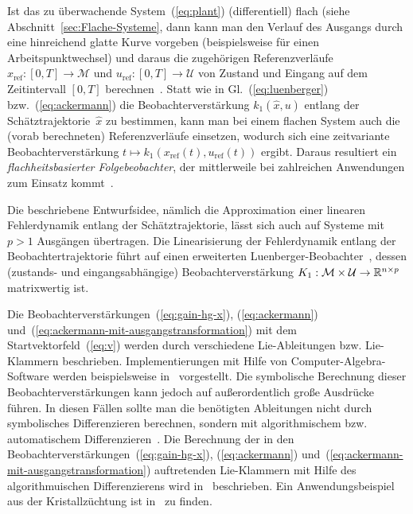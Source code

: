 \begin{remark}
Ist das zu überwachende System~(\ref{eq:plant}) (differentiell)
flach (siehe Abschnitt~\ref{sec:Flache-Systeme}, dann kann man den
Verlauf des Ausgangs durch eine hinreichend glatte Kurve vorgeben
(beispielsweise für einen Arbeitspunktwechsel) und daraus die zugehörigen
Referenzverläufe $x_{\text{ref}}:[0,T]\to\mathcal{M}$ und $u_{\text{ref}}:[0,T]\to\mathcal{U}$
von Zustand und Eingang auf dem Zeitintervall $[0,T]$ berechnen~\cite{FLMR95ijc,rothfuss97flach,rudolph2003habil}.
Statt wie in Gl.~(\ref{eq:luenberger}) bzw.~(\ref{eq:ackermann})
die Beobachterverstärkung $k_{1}(\hat{x},u)$ entlang der Schätztrajektorie~$\hat{x}$
zu bestimmen, kann man bei einem flachen System auch die (vorab berechneten)
Referenzverläufe einsetzen, wodurch sich eine zeitvariante Beobachterverstärkung
$t\mapsto k_{1}(x_{\text{ref}}(t),u_{\text{ref}}(t))$ ergibt. Daraus
resultiert ein \emph{flachheitsbasierter Folgebeobachter},
der mittlerweile bei zahlreichen Anwendungen zum Einsatz kommt~\cite{fliess96,bindel2000}.
\end{remark}

\begin{remark}
Die beschriebene Entwurfsidee, nämlich die Approximation einer linearen
Fehlerdynamik entlang der Schätztrajektorie, lässt sich auch auf Systeme
mit $p>1$ Ausgängen übertragen. Die Linearisierung der Fehlerdynamik
entlang der Beobachtertrajektorie führt auf einen erweiterten Luenberger-Beobachter~\cite{birk88,birk92},
dessen (zustands- und eingangsabhängige) Beobachterverstärkung $K_{1}:\mathcal{M}\times\mathcal{U}\to{\mathbb{R}}^{n\times p}$
matrixwertig ist.
\end{remark}

\begin{remark}
Die Beobachterverstärkungen~(\ref{eq:gain-hg-x}), (\ref{eq:ackermann})
und~(\ref{eq:ackermann-mit-ausgangstransformation}) mit dem Startvektorfeld~(\ref{eq:v})
werden durch verschiedene Lie-Ableitungen bzw. Lie-Klammern beschrieben.
Implementierungen mit Hilfe von Computer-Algebra-Software werden beispielsweise
in~\cite{birk89,birk90,birk92,rothfuss95} vorgestellt. Die symbolische
Berechnung dieser Beobachterverstärkungen kann jedoch auf außerordentlich
große Ausdrücke führen. In diesen Fällen sollte man die benötigten
Ableitungen nicht durch symbolisches Differenzieren berechnen, sondern
mit algorithmischem bzw. automatischem Differenzieren~\cite{griewank2008}.
Die Berechnung der in den Beobachterverstärkungen~(\ref{eq:gain-hg-x}),
(\ref{eq:ackermann}) und~(\ref{eq:ackermann-mit-ausgangstransformation})
auftretenden Lie-Klammern mit Hilfe des algorithmuischen Differenzierens
wird in~\cite{roebenack2003buch,roebenack2004ima,roebenack2004nolcos,roebenack2005habil}
beschrieben. Ein Anwendungsbeispiel aus der Kristallzüchtung ist in~\cite{lindert-gamm2004,winkler2012ssd}
zu finden.
\end{remark}

